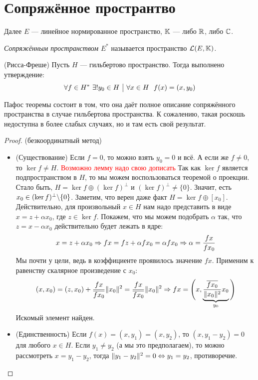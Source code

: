 \section{Сопряжённое пространтво}

\begin{note}
	Далее $E$ --- линейное нормированное пространство, $\mathbb{K}$ --- либо $\mathbb{R}$, либо $\mathbb{C}$.
\end{note}

\begin{definition}
	\textit{Сопряжённым пространством} $E^*$ называется пространство $\mathcal{L}(E, \mathbb{K})$.
\end{definition}

\begin{theorem} (Рисса-Фреше)
	Пусть $H$ --- гильбертово пространство. Тогда выполнено утверждение:
	\[
		\forall f \in H^*\ \exists! y_0 \in H \ \big|\  \forall x \in H\ \ f(x) = (x, y_0)
	\]
\end{theorem}

\begin{note}
	Пафос теоремы состоит в том, что она даёт полное описание сопряжённого пространства в случае гильбертова пространства. К сожалению, такая роскошь недоступна в более слабых случаях, но и там есть свой результат.
\end{note}

\begin{proof} (безкоординатный метод)
	\begin{itemize}
		\item (Существование) Если $f = 0$, то можно взять $y_0 = 0$ и всё. А если же $f \neq 0$, то $\ker f \neq H$. \textcolor{red}{Возможно лемму надо свою дописать} Так как $\ker f$ является подпространством в $H$, то мы можем воспользоваться теоремой о проекции. Стало быть, $H = \ker f \oplus (\ker f)^\bot$ и $(\ker f)^\bot \neq \{0\}$. Значит, есть $x_0 \in (\ker f)^\bot \backslash \{0\}$. Заметим, что верен даже факт $H = \ker f \oplus [x_0]$. Действительно, для произвольный $x \in H$ нам надо представить в виде $x = z + \alpha x_0$, где $z \in \ker f$. Покажем, что мы можем подобрать $\alpha$ так, что $z = x - \alpha x_0$ действительно будет лежать в ядре:
		\[
			x = z + \alpha x_0 \Rightarrow fx = fz + \alpha fx_0 = \alpha fx_0 \Rightarrow \alpha = \frac{fx}{fx_0}
		\]
		Мы почти у цели, ведь в коэффициенте проявилось значение $fx$. Применим к равенству скалярное произведение с $x_0$:
		\[
			(x, x_0) = (z, x_0) + \frac{fx}{\overline{fx_0}} \|x_0\|^2 = \frac{fx}{\overline{fx_0}} \|x_0\|^2 \Rightarrow fx = \Bigg(x, \underbrace{\frac{\overline{fx_0}}{\|x_0\|^2} x_0}_{y_0}\Bigg)
		\]
		Искомый элемент найден.
		
		\item (Единственность) Если $f(x) = (x, y_1) = (x, y_2)$, то $(x, y_1 - y_2) = 0$ для любого $x \in H$. Если $y_1 \neq y_2$ (а мы это предполагаем), то можно рассмотреть $x = y_1 - y_2$, тогда $\|y_1 - y_2\|^2 = 0 \Leftrightarrow y_1 = y_2$, противоречие.
	\end{itemize}
\end{proof}

